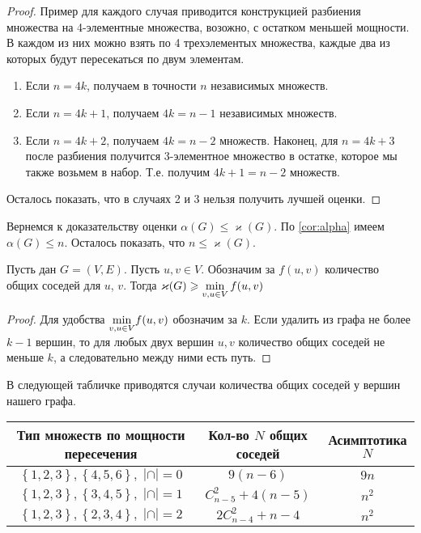 \begin{proof}
	Пример для каждого случая приводится конструкцией разбиения множества на 4-элементные множества, возожно, с остатком меньшей мощности. В каждом из них можно взять по 4 трехэлементых множества, каждые два из которых будут пересекаться по двум элементам.
	\begin{enumerate} \renewcommand{\theenumi}{\arabic{enumi}}
		\item Если $ n = 4k $, получаем в точности $ n $ независимых множеств.
		\item Если $ n = 4k + 1 $, получаем $ 4k = n-1 $ независимых множеств.
		\item Если $ n = 4k + 2 $, получаем $ 4k = n-2 $ множеств. Наконец, для $ n = 4k + 3 $ после разбиения получится 3-элементное множество в остатке, которое мы также возьмем в набор. Т.е. получим $ 4k + 1 = n-2 $ множеств.
	\end{enumerate}

Осталось показать, что в случаях 2 и 3 нельзя получить лучшей оценки.
\end{proof}

Вернемся к доказательству оценки $\alpha(G) \leqslant \varkappa(G)$. По \ref{cor:alpha} имеем $\alpha(G) \leqslant n $. Осталось показать, что $n \leqslant \varkappa(G) $.

\begin{lemma}
	Пусть дан $ G = (V, E) $. Пусть $ u, v \in V $. Обозначим за $ f(u, v) $ количество общих соседей для $ u $, $ v $. Тогда $ \varkappa(G) \geqslant \mathlarger {\min_{v, u \in V} f(u, v) }$
\end{lemma} \label{lemma:neigh}

 \begin{proof}
 	Для удобства $ \mathlarger \min_{v, u \in V} f(u, v) $ обозначим за $ k $.
 	Если удалить из графа не более $ k - 1 $ вершин, то для любых двух вершин $ u, v $ количество общих соседей не меньше $ k $, а следовательно между ними есть путь.
 \end{proof}



В следующей табличке приводятся случаи количества общих соседей у вершин нашего графа.

\begin{center}
	\begin{tabular}[h!]{|ccc|}
		\hline
		
		Тип множеств по мощности пересечения & Кол-во $ N $ общих соседей & Асимптотика $ N $ \\
		\hline 
		$  \left\lbrace 1, 2, 3 \right\rbrace, \left\lbrace 4, 5, 6 \right\rbrace, \; |\cap| = 0 $ & $ 9(n - 6)$ & $ 9n $ \\ 
		$  \left\lbrace 1, 2, 3 \right\rbrace, \left\lbrace 3, 4, 5 \right\rbrace, \; |\cap| = 1 $ & $ C_{n-5}^2 + 4(n-5) $ & $ n^2 $ \\
		$  \left\lbrace 1, 2, 3 \right\rbrace, \left\lbrace 2, 3, 4 \right\rbrace, \; |\cap| = 2 $ & $ 2C_{n-4}^2 + n - 4 $ & $ n^2 $  \\
		\hline
	\end{tabular}
\end{center}

